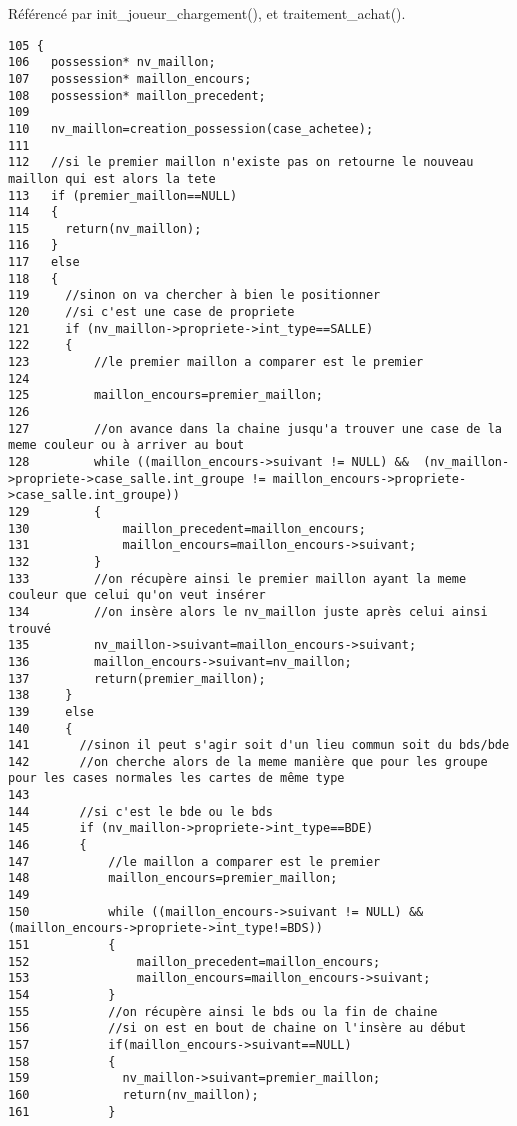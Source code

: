 R\'{e}f\'{e}renc\'{e} par init\_\-joueur\_\-chargement(), et traitement\_\-achat().

\begin{Code}\begin{verbatim}105 {
106   possession* nv_maillon;
107   possession* maillon_encours;
108   possession* maillon_precedent;
109   
110   nv_maillon=creation_possession(case_achetee);
111   
112   //si le premier maillon n'existe pas on retourne le nouveau maillon qui est alors la tete
113   if (premier_maillon==NULL)
114   {
115     return(nv_maillon);
116   }
117   else
118   {
119     //sinon on va chercher à bien le positionner
120     //si c'est une case de propriete
121     if (nv_maillon->propriete->int_type==SALLE)
122     {
123         //le premier maillon a comparer est le premier
124                       
125         maillon_encours=premier_maillon;
126 
127         //on avance dans la chaine jusqu'a trouver une case de la meme couleur ou à arriver au bout
128         while ((maillon_encours->suivant != NULL) &&  (nv_maillon->propriete->case_salle.int_groupe != maillon_encours->propriete->case_salle.int_groupe))
129         {
130             maillon_precedent=maillon_encours;
131             maillon_encours=maillon_encours->suivant;
132         }
133         //on récupère ainsi le premier maillon ayant la meme couleur que celui qu'on veut insérer
134         //on insère alors le nv_maillon juste après celui ainsi trouvé
135         nv_maillon->suivant=maillon_encours->suivant;
136         maillon_encours->suivant=nv_maillon;
137         return(premier_maillon);
138     }
139     else
140     {
141       //sinon il peut s'agir soit d'un lieu commun soit du bds/bde
142       //on cherche alors de la meme manière que pour les groupe pour les cases normales les cartes de même type
143       
144       //si c'est le bde ou le bds
145       if (nv_maillon->propriete->int_type==BDE)
146       {     
147           //le maillon a comparer est le premier
148           maillon_encours=premier_maillon;
149         
150           while ((maillon_encours->suivant != NULL) &&  (maillon_encours->propriete->int_type!=BDS))
151           {
152               maillon_precedent=maillon_encours;
153               maillon_encours=maillon_encours->suivant;
154           }
155           //on récupère ainsi le bds ou la fin de chaine
156           //si on est en bout de chaine on l'insère au début
157           if(maillon_encours->suivant==NULL)
158           {
159             nv_maillon->suivant=premier_maillon;
160             return(nv_maillon);
161           }

\end{verbatim}
\end{Code}
